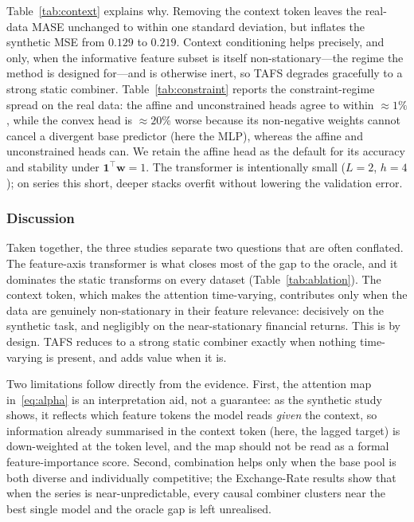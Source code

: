 \documentclass[journal]{IEEEtran}
\begin{document}
Table~\ref{tab:context} explains why. Removing the context token leaves the real-data MASE unchanged to within one standard deviation, but inflates the synthetic MSE from $0.129$ to $0.219$. Context conditioning helps precisely, and only, when the informative feature subset is itself non-stationary---the regime the method is designed for---and is otherwise inert, so TAFS degrades gracefully to a strong static combiner. Table~\ref{tab:constraint} reports the constraint-regime spread on the real data: the affine and unconstrained heads agree to within $\approx1\%$, while the convex head is $\approx20\%$ worse because its non-negative weights cannot cancel a divergent base predictor (here the MLP), whereas the affine and unconstrained heads can. We retain the affine head as the default for its accuracy and stability under $\mathbf{1}^{\!\top}\mathbf{w}{=}1$. The transformer is intentionally small ($L{=}2$, $h{=}4$); on series this short, deeper stacks overfit without lowering the validation error.

\subsubsection{Discussion}

Taken together, the three studies separate two questions that are often conflated. The feature-axis transformer is what closes most of the gap to the oracle, and it dominates the static transforms on every dataset (Table~\ref{tab:ablation}). The context token, which makes the attention time-varying, contributes only when the data are genuinely non-stationary in their feature relevance: decisively on the synthetic task, and negligibly on the near-stationary financial returns. This is by design. TAFS reduces to a strong static combiner exactly when nothing time-varying is present, and adds value when it is.

Two limitations follow directly from the evidence. First, the attention map in~\eqref{eq:alpha} is an interpretation aid, not a guarantee: as the synthetic study shows, it reflects which feature tokens the model reads \emph{given} the context, so information already summarised in the context token (here, the lagged target) is down-weighted at the token level, and the map should not be read as a formal feature-importance score. Second, combination helps only when the base pool is both diverse and individually competitive; the Exchange-Rate results show that when the series is near-unpredictable, every causal combiner clusters near the best single model and the oracle gap is left unrealised.
\end{document}
